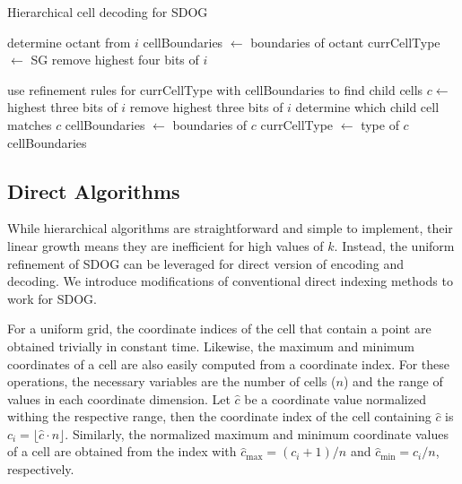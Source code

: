 \begin{algorithm}[htp!]
	\caption{Hierarchical cell decoding for SDOG}
	
	\begin{algorithmic}
		
		\STATE determine octant from $i$
		\STATE cellBoundaries $\leftarrow$ boundaries of octant
		\STATE currCellType $\leftarrow$ SG
		\STATE remove highest four bits of $i$
		
		\STATE use refinement rules for currCellType with cellBoundaries to find child cells
		\STATE $c \leftarrow$ highest three bits of $i$
		\STATE remove highest three bits of $i$
		\STATE determine which child cell matches $c$
		\STATE cellBoundaries $\leftarrow$ boundaries of $c$
		\STATE currCellType $\leftarrow$ type of $c$
		\ENDFOR
		\RETURN cellBoundaries
		
	\end{algorithmic}
	\label{alg:decode}
\end{algorithm}


\subsection{Direct Algorithms}
While hierarchical algorithms are straightforward and simple to implement, their linear growth means they are inefficient for high values of $k$.
Instead, the uniform refinement of SDOG can be leveraged for direct version of encoding and decoding.
We introduce modifications of conventional direct indexing methods to work for SDOG.


For a uniform grid, the coordinate indices of the cell that contain a point are obtained trivially in constant time.
Likewise, the maximum and minimum coordinates of a cell are also easily computed from a coordinate index.
For these operations, the necessary variables are the number of cells ($n$) and the range of values in each coordinate dimension.
Let $\hat{c}$ be a coordinate value normalized withing the respective range, then the coordinate index of the cell containing $\hat{c}$ is $c_i = \lfloor \hat{c} \cdot n \rfloor$.
Similarly, the normalized maximum and minimum coordinate values of a cell are obtained from the index with
$\hat{c}_\mathrm{max} = (c_i + 1) / n$ and $\hat{c}_\mathrm{min} = c_i / n$, respectively.



